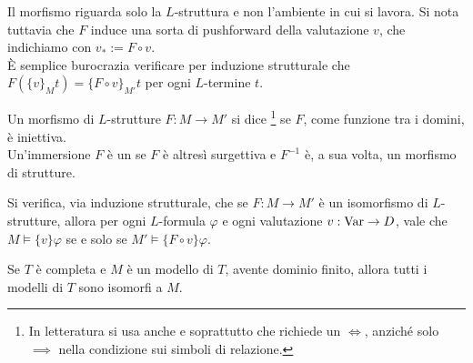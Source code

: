\begingroup
{}
\begin{remark}
    Il morfismo riguarda solo la $L$-struttura e non l'ambiente in cui si lavora. %
    Si nota tuttavia che $F$ induce una sorta di pushforward della valutazione $v$, che indichiamo con $v_* := F \circ v$. \\
    È semplice burocrazia verificare per induzione strutturale che $F(\{v\}_M t) = \{F \circ v\}_{M'} t$ per ogni $L$-termine $t$.
\end{remark}
\endgroup

\begin{definition}
    Un morfismo di $L$-strutture $F : M \to M'$ si dice \footnote{In letteratura si usa anche e soprattutto  che richiede un $\iff$, anziché solo $\implies$ nella condizione sui simboli di relazione.}
    se $F$, come funzione tra i domini, è iniettiva.\\ Un'immersione $F$ è un  se $F$ è altresì surgettiva e $F^{-1}$ è, a sua volta, un morfismo di strutture.
\end{definition}

\begin{samepage}
\begin{remark}
    Si verifica, via induzione strutturale, che se $F : M \to M'$ è un isomorfismo di $L$-strutture, allora per ogni $L$-formula $\varphi$ e ogni valutazione $v : \operatorname{Var} \to D$, vale che $M \models\{v\} \varphi$ se e solo se $M' \models\{F \circ v\} \varphi$.
\end{remark}
\end{samepage}

\begin{exercise}
    Se $T$ è completa e $M$ è un modello di $T$, avente dominio finito, allora tutti i modelli di $T$ sono isomorfi a $M$.
\end{exercise}

